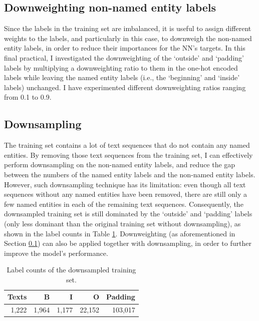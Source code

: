 \documentclass[11pt,a4paper]{article}
\begin{document}
\subsection{Downweighting non-named entity labels} \label{subsection:downweighting}

Since the labels in the training set are imbalanced, it is useful to assign different weights to the labels, and particularly in this case, to downweigh the non-named entity labels, in order to reduce their importances for the NN's targets. In this final practical, I investigated the downweighting of the `outside' and `padding' labels by multiplying a downweighting ratio to them in the one-hot encoded labels while leaving the named entity labels (i.e., the `beginning' and `inside' labels) unchanged. I have experimented different downweighting ratios ranging from 0.1 to 0.9.

\subsection{Downsampling} \label{subsection:downsampling}

The training set contains a lot of text sequences that do not contain any named entities. By removing those text sequences from the training set, I can effectively perform downsampling on the non-named entity labels, and reduce the gap between the numbers of the named entity labels and the non-named entity labels. However, such downsampling technique has its limitation: even though all text sequences without any named entities have been removed, there are still only a few named entities in each of the remaining text sequences. Consequently, the downsampled training set is still dominated by the `outside' and `padding' labels (only less dominant than the original training set without downsampling), as shown in the label counts in Table \ref{table:downsampled-label-counts}. Downweighting (as aforementioned in Section \ref{subsection:downweighting}) can also be applied together with downsampling, in order to further improve the model's performance.

\begin{table}
    \centering
    \begin{tabular}{rrrrr}
        \hline 
        \textbf{Texts} & \textbf{B} & \textbf{I} & \textbf{O} & \textbf{Padding} \\
        \hline
        1,222 & 1,964 & 1,177 & 22,152 & 103,017 \\
        \hline
    \end{tabular}
    \caption{Label counts of the downsampled training set.}
    \label{table:downsampled-label-counts}
\end{table}
\end{document}
